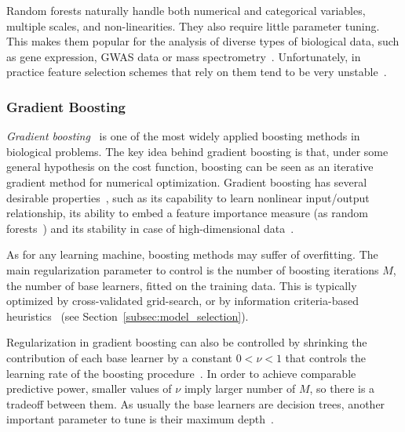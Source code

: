     Random forests naturally handle both numerical and categorical variables, multiple scales, and non-linearities. They also require little parameter tuning. This makes them popular for the analysis of diverse types of biological data, such as gene expression, GWAS data or mass spectrometry~\cite{qi2012random}. Unfortunately, in practice feature selection schemes that rely on them tend to be very unstable~\cite{kursa2014robustness}.

    \subsubsection{Gradient Boosting}
    \textit{Gradient boosting}~\citep{friedman2001greedy}  is one of the most widely applied boosting methods in biological problems.
    The key idea behind gradient boosting is that, under some general hypothesis on the cost function, boosting can be seen as an iterative gradient method for numerical optimization.
    Gradient boosting has several desirable properties~\citep{mayr2014evolution}, such as its capability to learn nonlinear input/output relationship, its ability to embed a feature importance measure (as random forests~\citep{hastie2009elements}) and its stability in case of high-dimensional data~\citep{buehlmann2006boosting}.


    As for any learning machine, boosting methods may suffer of overfitting. The main regularization parameter to control is the number of boosting iterations $M$, \ie the number of base learners, fitted on the training data. This is typically optimized by cross-validated grid-search, or by information criteria-based heuristics~\citep{tutz2006generalized, tutz2007boosting} (see Section~\ref{subsec:model_selection}).

    Regularization in gradient boosting can also be controlled by shrinking the contribution of each base learner by a constant $0<\nu<1$ that controls the learning rate of the boosting procedure~\citep{hastie2009elements}. In order to achieve comparable predictive power, smaller values of $\nu$ imply larger number of $M$, so there is a tradeoff between them.
    As usually the base learners are decision trees, another important parameter to tune is their maximum depth~\citep{hastie2009elements}.


